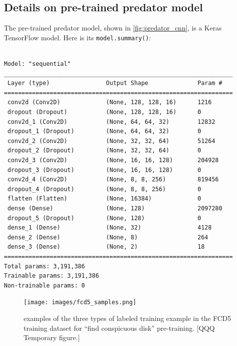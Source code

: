 \documentclass[acmtog]{acmart}
\begin{document}
\subsection{Details on pre-trained predator model}
The pre-trained predator model, shown in \ref{fig:predator_cnn}, is a Keras TensorFlow model. Here is its \texttt{model.summary()}:
\begin{adjustwidth}{1cm}{0cm}
\begin{small}
\begin{verbatim}

Model: "sequential"
_________________________________________________________________
 Layer (type)                Output Shape              Param #
=================================================================
 conv2d (Conv2D)             (None, 128, 128, 16)      1216
 dropout (Dropout)           (None, 128, 128, 16)      0
 conv2d_1 (Conv2D)           (None, 64, 64, 32)        12832
 dropout_1 (Dropout)         (None, 64, 64, 32)        0
 conv2d_2 (Conv2D)           (None, 32, 32, 64)        51264
 dropout_2 (Dropout)         (None, 32, 32, 64)        0
 conv2d_3 (Conv2D)           (None, 16, 16, 128)       204928
 dropout_3 (Dropout)         (None, 16, 16, 128)       0
 conv2d_4 (Conv2D)           (None, 8, 8, 256)         819456
 dropout_4 (Dropout)         (None, 8, 8, 256)         0
 flatten (Flatten)           (None, 16384)             0
 dense (Dense)               (None, 128)               2097280
 dropout_5 (Dropout)         (None, 128)               0
 dense_1 (Dense)             (None, 32)                4128
 dense_2 (Dense)             (None, 8)                 264
 dense_3 (Dense)             (None, 2)                 18
=================================================================
Total params: 3,191,386
Trainable params: 3,191,386
Non-trainable params: 0
\end{verbatim}
\end{small}
\end{adjustwidth}

\begin{figure}[b]
    \texttt{[image: images/fcd5\_samples.png]}
    \caption{examples of the three types of labeled training example in the FCD5 training dataset for “find conspicuous disk” pre-training.  [QQQ Temporary figure.]}
    \label{fig:fcd5_samples}
\end{figure}

\end{document}
